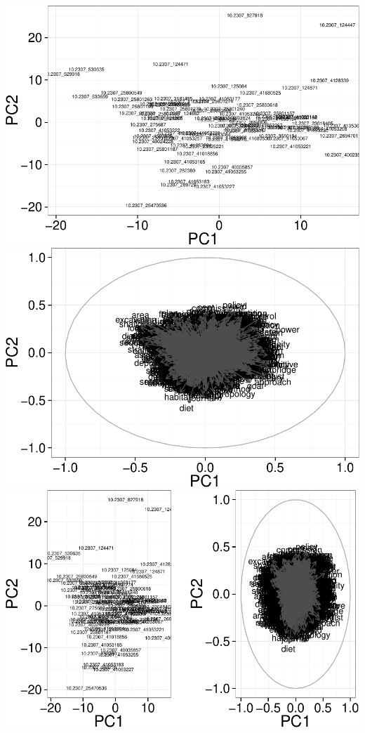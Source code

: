 \documentclass[10pt]{article}
\newenvironment{CodeChunk}{}{}
\begin{document}
\begin{CodeChunk}
\begin{CodeChunk}
\includegraphics{509Assignment_files/figure-latex/onegram3-10} 
\includegraphics{509Assignment_files/figure-latex/onegram3-11} 
\includegraphics{509Assignment_files/figure-latex/onegram3-12} 

\end{CodeChunk}
\end{CodeChunk}
\end{document}
